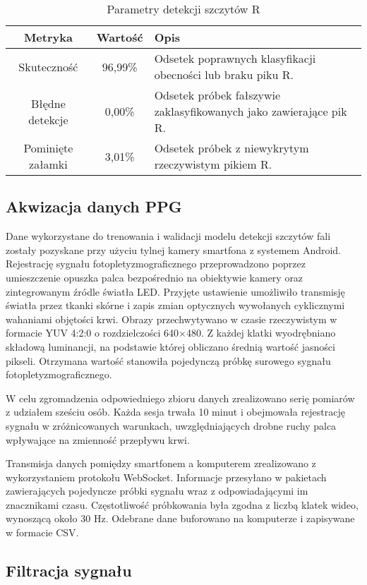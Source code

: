 \documentclass[journal]{IEEEtran}
\begin{document}
\begin{table}[ht]
\centering
\caption{Parametry detekcji szczytów R}
\label{tab:metrics}
\begin{tabular}{|c|c|p{4.6cm}|}
\hline
\textbf{Metryka} & \textbf{Wartość} & \textbf{Opis} \\
\hline
Skuteczność & 96,99\% & Odsetek poprawnych klasyfikacji obecności lub braku piku R. \\
\hline
Błędne detekcje & 0,00\% & Odsetek próbek fałszywie zaklasyfikowanych jako zawierające pik R. \\
\hline
Pominięte załamki & 3,01\% & Odsetek próbek z niewykrytym rzeczywistym pikiem R. \\
\hline
\end{tabular}
\end{table}


\subsection{Akwizacja danych PPG}
Dane wykorzystane do trenowania i walidacji modelu detekcji szczytów fali zostały pozyskane przy użyciu tylnej kamery smartfona z systemem Android. Rejestrację sygnału fotopletyzmograficznego przeprowadzono poprzez umieszczenie opuszka palca bezpośrednio na obiektywie kamery oraz zintegrowanym źródle światła LED. Przyjęte ustawienie umożliwiło transmisję światła przez tkanki skórne i zapis zmian optycznych wywołanych cyklicznymi wahaniami objętości krwi. Obrazy przechwytywano w czasie rzeczywistym w formacie YUV 4:2:0 o rozdzielczości 640×480. Z każdej klatki wyodrębniano składową luminancji, na podstawie której obliczano średnią wartość jasności pikseli. Otrzymana wartość stanowiła pojedynczą próbkę surowego sygnału fotopletyzmograficznego.

W celu zgromadzenia odpowiedniego zbioru danych zrealizowano serię pomiarów z udziałem sześciu osób. Każda sesja trwała 10 minut i obejmowała rejestrację sygnału w zróżnicowanych warunkach, uwzględniających drobne ruchy palca wpływające na zmienność przepływu krwi.

Transmisja danych pomiędzy smartfonem a komputerem zrealizowano z wykorzystaniem protokołu WebSocket. Informacje przesyłano w pakietach zawierających pojedyncze próbki sygnału wraz z odpowiadającymi im znacznikami czasu. Częstotliwość próbkowania była zgodna z liczbą klatek wideo, wynoszącą około 30 Hz. Odebrane dane buforowano na komputerze i zapisywane w formacie CSV.

\subsection{Filtracja sygnału}
\end{document}
